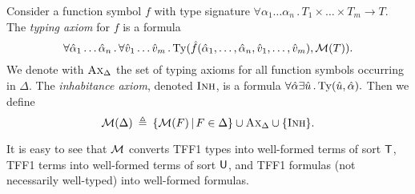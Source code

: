 \newcommand{\AxD}{\text{\sc Ax}_{\Delta}}
\newcommand{\Inh}{\text{\sc Inh}}
\newcommand{\Dom}{\mathrm{Dom}}

Consider a function symbol $f$ with type signature
$\forall \alpha_1\dots\alpha_n \,.\, T_1 \times \dots \times T_m \to T$.
The {\em typing axiom\/} for $f$ is a formula
$$
\forall \hat{\alpha}_1\dots\hat{\alpha}_n \,.\,
\forall \hat{v}_1\dots\hat{v}_m \,.\,
\mathrm{Ty}(\hat{f}(\hat{\alpha}_1,\dots,\hat{\alpha}_n,
\hat{v}_1,\dots,\hat{v}_m), \mathcal{M}(T)).
$$
We denote with $\AxD$ the set of typing axioms
for all function symbols occurring in $\Delta$.
The {\em inhabitance axiom}, denoted $\Inh$,
is a formula
$\forall \hat{\alpha} \exists \hat{u} \,.\,
\mathrm{Ty}(\hat{u},\hat{\alpha}).$
Then we define
$$
\MON(\Delta) \eqdef \{ \MON(F) \vb F \in \Delta \} \cup
\AxD \cup \{ \Inh \}.
$$

It is easy to see that $\mathcal{M}$ converts TFF1 types into well-formed
terms of sort $\mathsf{T}$, TFF1 terms into well-formed terms of sort $\mathsf{U}$,
and TFF1 formulas (not necessarily well-typed) into well-formed formulas.

